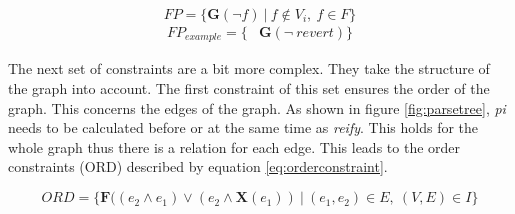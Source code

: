 \documentclass{article}
\begin{document}
\begin{equation}
    FP = \{ \textbf{G}(\neg f)    \ |\ f \notin V_i,\ f \in F\} \label{eq:functionprevention}
\end{equation}
\begin{align*}
    FP_{example} = \{& \textbf{G}(\neg\ revert)\} 
\end{align*}















 
The next set of constraints are a bit more complex. They take the structure of the graph into account. The first constraint of this set ensures the order of the graph. This concerns the edges of the graph. As shown in figure \ref{fig:parsetree}, \textit{pi} needs to be calculated before or at the same time as \textit{reify}. This holds for the whole graph thus there is a relation for each edge. This leads to the order constraints (ORD) described by equation \ref{eq:orderconstraint}.

\begin{equation}
    ORD = \{\textbf{F}((e_2 \wedge e_1) \vee (e_2 \wedge \textbf{X} (e_1)  )\  |\  (e_1,e_2) \in  E ,\ (V,E) \in  I  \} \label{eq:orderconstraint}
\end{equation}
\end{document}
